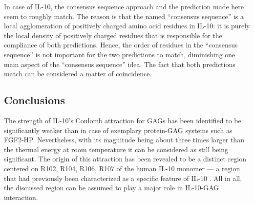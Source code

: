 In case of IL-10, the consensus sequence approach and the prediction made here
seem to roughly match. The reason is that the named \enquote{consensus sequence}
is a local agglomeration of positively charged amino acid residues in IL-10: it
is purely the local density of positively charged residues that is responsible
for the compliance of both predictions. Hence, the order of residues in the
\enquote{consensus sequence} is not important for the two predictions to match,
diminishing one main aspect of the \enquote{consensus sequence} idea. The fact
that both predictions match can be considered a matter of coincidence.



\subsection{Conclusions}
The strength of IL-10's Coulomb attraction for GAGs has been identified to be
significantly weaker than in case of exemplary protein-GAG systems such as
FGF2-HP. Nevertheless, with its magnitude being about three times larger than
the thermal energy at room temperature it can be considered as still being
significant. The origin of this attraction has been revealed to be a distinct
region centered on R102, R104, R106, R107 of the human IL-10 monomer --- a
region that had previously been characterized as a specific feature of IL-10
\cite{Zdanov1995}. All in all, the discussed region can be assumed to play a
major role in IL-10-GAG interaction.